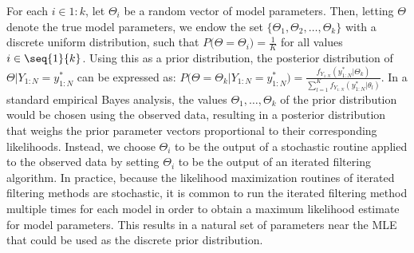 For each $i \in 1:k$, let $\Theta_i$ be a random vector of model parameters.
Then, letting $\Theta$ denote the true model parameters, we endow the set $\{\Theta_1, \Theta_2, \ldots, \Theta_k\}$ with a discrete uniform distribution, such that $P\big(\Theta = \Theta_i\big) = \frac{1}{K}$ for all values $i \in \seq{1}{k}$.
Using this as a prior distribution, the posterior distribution of $\Theta | Y_{1:N} = y_{1:N}^*$ can be expressed as:
$P\big(\Theta = \Theta_k | Y_{1:N} = y_{1:N}^*\big) = \frac{f_{Y_{1:N}}(y_{1:N}^*| \Theta_k)}{\sum_{l = 1}^K f_{Y_{1:N}}(y_{1:N}^*| \theta_l)}$.
In a standard empirical Bayes analysis, the values $\Theta_1, \ldots, \Theta_k$ of the prior distribution would be chosen using the observed data, resulting in a posterior distribution that weighs the prior parameter vectors proportional to their corresponding likelihoods.
Instead, we choose $\Theta_i$ to be the output of a stochastic routine applied to the observed data by setting $\Theta_i$ to be the output of an iterated filtering algorithm.
In practice, because the likelihood maximization routines of iterated filtering methods are stochastic, it is common to run the iterated filtering method multiple times for each model in order to obtain a maximum likelihood estimate for model parameters.
This results in a natural set of parameters near the MLE that could be used as the discrete prior distribution.
